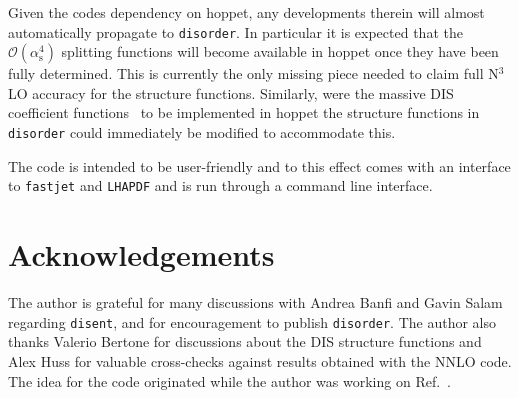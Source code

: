 \documentclass[submission, PhysCodeb]{SciPost}
\newcommand{\hoppet}{{\sc hoppet}}
\newcommand{\disent}{{\tt disent}}
\newcommand{\disorder}{{\tt disorder}}
\newcommand{\fastjet}{{\tt fastjet}}
\newcommand{\lhapdf}{{\tt LHAPDF}}
\newcommand{\nnlojet}{NNLO{\sc{jet}}}
\newcommand{\as}{\alpha_{\mathrm{s}}}
\newcommand{\NNNLO}{N$^3$LO}
\begin{document}
Given the codes dependency on \hoppet{}, any developments therein will
almost automatically propagate to \disorder{}. In particular it is
expected that the $\mathcal{O}(\as^4)$ splitting functions will become
available in \hoppet{} once they have been fully determined. This is
currently the only missing piece needed to claim full \NNNLO{}
accuracy for the structure functions. Similarly, were the massive DIS
coefficient
functions~\cite{Gottschalk:1980rv,Laenen:1992zk,Laenen:1992xs,Gluck:1997sj,Blumlein:2011zu,Behring:2015roa,Berger:2016inr,Gao:2017kkx}
to be implemented in \hoppet{} the structure functions in \disorder{}
could immediately be modified to accommodate this.

The code is intended to be user-friendly and to this effect comes with
an interface to \fastjet{} and \lhapdf{} and is run through a
command line interface. 

\section*{Acknowledgements}
The author is grateful for many discussions with Andrea Banfi and
Gavin Salam regarding \disent{}, and for encouragement to publish
\disorder{}. The author also thanks Valerio Bertone for discussions
about the DIS structure functions and Alex Huss for valuable cross-checks
against results obtained with the \nnlojet{} code. The idea for the
code originated while the author was working on
Ref.~\cite{Banfi:2023mhz}.


%
%



\nolinenumbers
\end{document}
